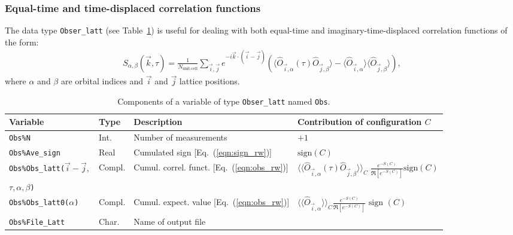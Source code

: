 \subsubsection{ Equal-time and time-displaced correlation functions}

The data type \texttt{Obser\_latt} (see Table~\ref{table:Obser_latt}) is useful for dealing with both equal-time and imaginary-time-displaced correlation functions of the form: 
\begin{align}\label{eqn:s}
	S_{\alpha,\beta}(\vec{k},\tau) =   \frac{1}{N_{\text{unit-cell}}} \sum_{\vec{i},\vec{j}}  e^{-i \vec{k} \cdot \left( \vec{i}-\vec{j}\right) } \left( \langle \hat{O}_{\vec{i},\alpha} (\tau) \hat{O}_{\vec{j},\beta} \rangle  - 
	  \langle \hat{O}_{\vec{i},\alpha} \rangle \langle   \hat{O}_{\vec{j},\beta}  \rangle \right),
\end{align}
where $\alpha$ and $\beta$ are orbital indices and $\vec{i}$ and $\vec{j}$ lattice positions.
%
\begin{table}[h]
	\begin{center}
	\begin{tabular}{@{} l l l l @{}}\toprule
		Variable  &  Type      &  Description &  Contribution of configuration $C$ \\\midrule
		\texttt{Obs\%N}                       &  Int.        &   Number of measurements &    $+1$\\
		\texttt{Obs\%Ave\_sign}  
		&  Real  &    Cumulated sign [Eq.~(\ref{eqn:sign_rw})] & $\text{sign}(C)$  \\
		\texttt{Obs\%Obs\_latt($\vec{i}-\vec{j},$}        & Compl.      &    Cumul.  correl. funct. [Eq.~(\ref{eqn:obs_rw})] &  $ \langle \langle \hat{O}_{\vec{i},\alpha} (\tau) \hat{O}_{\vec{j},\beta} \rangle \rangle_{C} \; \frac{e^{-S(C)}} {\Re \left[e^{-S(C)} \right]}  \text{sign}(C) $ \vspace{-4pt} \\
		\hfill \texttt{$\tau,\alpha,\beta$)} & & & \\
		\texttt{Obs\%Obs\_latt0($\alpha$)}        & Compl.      &    Cumul. expect. value [Eq.~(\ref{eqn:obs_rw})] &   $ \langle \langle \hat{O}_{\vec{i},\alpha} \rangle \rangle_{C}\frac{e^{-S(C)}} {\Re \left[e^{-S(C)} \right]}  \text{ sign }(C) $ \\
		\texttt{Obs\%File\_Latt}           &  Char.    &    Name of output file  &\\\bottomrule
	\end{tabular}
	\caption{Components of a variable of type \texttt{Obser\_latt} named \texttt{Obs}.}
	\label{table:Obser_latt}
\end{center}
\end{table}
